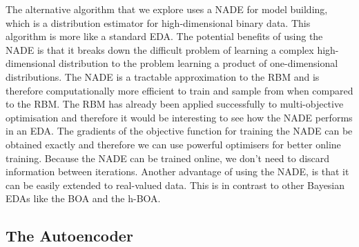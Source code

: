 \documentclass[twoside]{article}
\begin{document}
The alternative algorithm that we explore uses a NADE for model building, which is a distribution estimator for high-dimensional binary data. This algorithm is more like a standard EDA. The potential benefits of using the NADE is that it breaks down the difficult problem of learning a complex high-dimensional distribution to the problem learning a product of one-dimensional distributions. The NADE is a tractable approximation to the RBM and is therefore computationally more efficient to train and sample from when compared to the RBM. The RBM has already been applied successfully to multi-objective optimisation and therefore it would be interesting to see how the NADE performs in an EDA. The gradients of the objective function for training the NADE can be obtained exactly and therefore we can use powerful optimisers for better online training. Because the NADE can be trained online, we don't need to discard information between iterations. Another advantage of using the NADE, is that it can be easily extended to real-valued data. This is in contrast to other Bayesian EDAs like the BOA and the h-BOA. 





\subsection{The Autoencoder}

\end{document}
